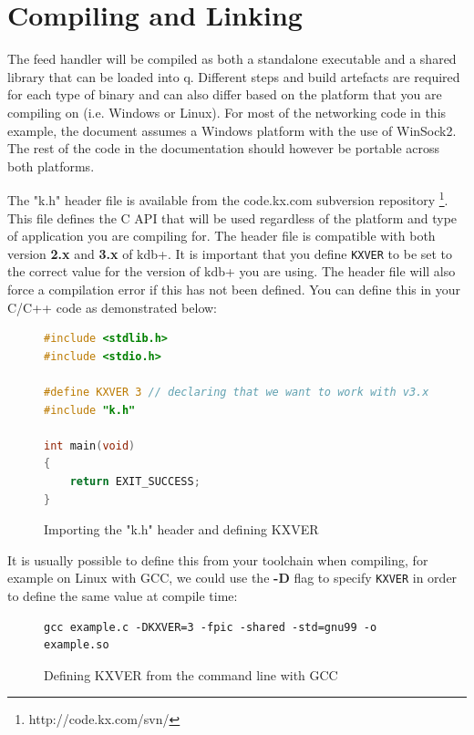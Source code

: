 \chapter{Compiling and Linking}

The feed handler will be compiled as both a standalone executable and a shared library that can
be loaded into q. Different steps and build artefacts are required for each type of binary and
can also differ based on the platform that you are compiling on (i.e. Windows or Linux). For
most of the networking code in this example, the document assumes a Windows platform with the
use of WinSock2. The rest of the code in the documentation should however be portable across
both platforms.

The "k.h" header file is available from the code.kx.com subversion repository \footnote{http://code.kx.com/svn/}.
This file defines the C API that will be used regardless of the platform and type of application you are
compiling for. The header file is compatible with both version \textbf{2.x} and \textbf{3.x} of kdb+. It is important
that you define \verb|KXVER| to be set to the correct value for the version of kdb+ you are using. The header file will
also force a compilation error if this has not been defined. You can define this in your C/C++ code as demonstrated below:

\begin{figure}[h]
\begin{lstlisting}[language=C]
#include <stdlib.h>
#include <stdio.h>

#define KXVER 3 // declaring that we want to work with v3.x of kdb+
#include "k.h"

int main(void)
{
	return EXIT_SUCCESS;
}
\end{lstlisting}
\caption{Importing the "k.h" header and defining KXVER}
\end{figure}

It is usually possible to define this from your toolchain when compiling, for example on Linux
with GCC, we could use the \textbf{-D} flag to specify \verb|KXVER| in order to define the same value at compile
time:

\begin{figure}[h]
\begin{lstlisting}
gcc example.c -DKXVER=3 -fpic -shared -std=gnu99 -o example.so
\end{lstlisting}
\caption{Defining KXVER from the command line with GCC}
\end{figure}

